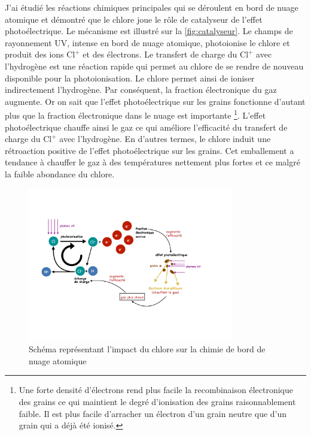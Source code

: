 J'ai étudié les réactions chimiques principales qui se déroulent en bord de nuage atomique et démontré que le chlore joue le rôle de catalyseur de l'effet photoélectrique. Le mécanisme est illustré sur la \autoref{fig:catalyseur}.
Le champs de rayonnement UV, intense en bord de nuage atomique, photoionise le chlore et produit des ions $\mathrm{Cl}^+$ et des électrons. Le transfert de charge du $\mathrm{Cl}^+$ avec l'hydrogène est une réaction rapide qui permet au chlore de se rendre de nouveau disponible pour la photoionisation. Le chlore permet ainsi de ioniser indirectement l'hydrogène. Par conséquent, la fraction électronique du gaz augmente.  
Or on sait que l'effet photoélectrique sur les grains fonctionne d'autant plus que la fraction électronique dans le nuage est importante \footnote{Une forte densité d'électrons rend plus facile la recombinaison électronique des grains ce qui maintient le degré d'ionisation des grains raisonnablement faible. Il est plus facile d'arracher un électron d'un grain neutre que d'un grain qui a déjà été ionisé.}. 
L'effet photoélectrique chauffe ainsi le gaz ce qui améliore l'efficacité du transfert de charge du $\mathrm{Cl}^+$ avec l'hydrogène. 
En d'autres termes, le chlore induit une rétroaction positive de l'effet photoélectrique sur les grains. Cet emballement a tendance à chauffer le gaz à des températures nettement plus fortes et ce malgré la faible abondance du chlore. \newline

\begin{figure}[b!]
   \centering
        \includegraphics[trim = {2cm 5cm 4cm 4cm},clip, width=0.8\textwidth]{figure/Cl/Cl_heating_fr-5.pdf}
    \caption{Schéma représentant l'impact du chlore sur la chimie de bord de nuage atomique}
    \label{fig:catalyseur}
\end{figure}{}

